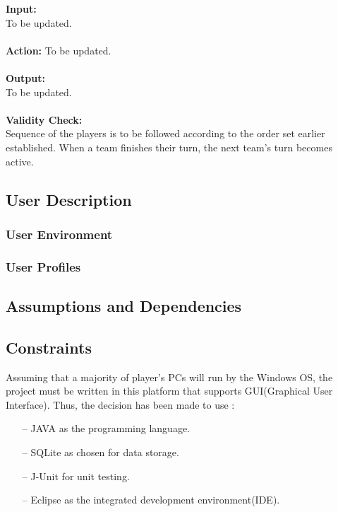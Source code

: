 \documentclass[10pt, a4paper]{article}
\begin{document}
		\textbf{Input:}\\
		To be updated.\\
		\\
		\textbf{Action:}
		To be updated.\\
		\\
		\textbf{Output:}\\
		To be updated.\\
		\\
		\textbf{Validity Check:}\\
		Sequence of the players is to be followed according to the order set earlier established. When a team finishes their turn, the next team's turn becomes active.\\
		
		
	\subsection{User Description}
	
		\subsubsection{User Environment}
		
		\subsubsection{User Profiles}
		
	\subsection{Assumptions and Dependencies}
	
	\subsection{Constraints}
	
	Assuming that a majority of player's PCs will run by the Windows OS, the project must be written in this platform that supports GUI(Graphical User Interface). Thus, the decision has been made to use :
	\begin{itemize}
		\item[--] JAVA as the programming language.
		\item[--] SQLite as chosen for data storage.
		\item[--] J-Unit for unit testing.
		\item[--] Eclipse as the integrated development environment(IDE).
	\end{itemize}
		
\end{document}
